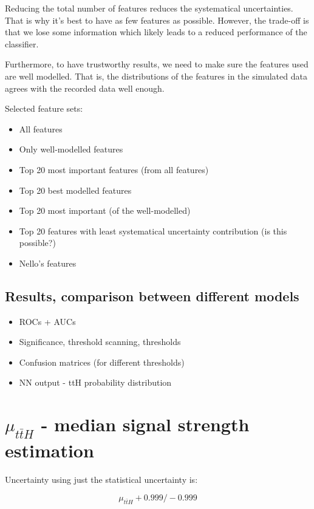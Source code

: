 \documentclass[twoside,draft,a4paper]{article}
\begin{document}
Reducing the total number of features reduces the systematical uncertainties. That is why it's best to have as few
features as possible. However, the trade-off is that we lose some information which likely leads to a reduced
performance of the classifier.

Furthermore, to have trustworthy results, we need to make sure the features used are well modelled. That is, the
distributions of the features in the simulated data agrees with the recorded data well enough.

Selected feature sets:

\begin{itemize}
    \item All features
    \item Only well-modelled features
    \item Top 20 most important features (from all features)
    \item Top 20 best modelled features
    \item Top 20 most important (of the well-modelled)
    \item Top 20 features with least systematical uncertainty contribution (is this possible?)
    \item Nello's features
\end{itemize}


\subsection{Results, comparison between different models}

\begin{itemize}
    \item ROCs + AUCs
    \item Significance, threshold scanning, thresholds
    \item Confusion matrices (for different thresholds)
    \item NN output - ttH probability distribution
\end{itemize}



\section{$\mu_{t\bar{t}H}$ - median signal strength estimation}

Uncertainty using just the statistical uncertainty is:

$$
    \mu_{t\bar{t}H} + 0.999 /-0.999
$$
\end{document}
